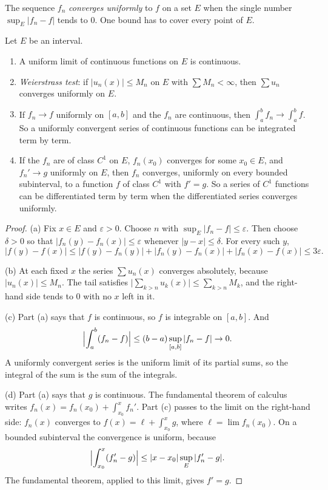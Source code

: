 The sequence $f_n$ \emph{converges uniformly} to $f$ on a set $E$ when the single number $\sup_E|f_n-f|$ tends to $0$. One bound has to cover every point of $E$.

\begin{lemma}\label{lem:uniform}
Let $E$ be an interval.
\begin{enumerate}[label=(\alph*)]
\item A uniform limit of continuous functions on $E$ is continuous.
\item \emph{Weierstrass test}: if $|u_n(x)|\le M_n$ on $E$ with $\sum M_n<\infty$, then $\sum u_n$ converges uniformly on $E$.
\item If $f_n\to f$ uniformly on $[a,b]$ and the $f_n$ are continuous, then $\int_a^bf_n\to\int_a^bf$. So a uniformly convergent
series of continuous functions can be integrated term by term.
\item If the $f_n$ are of class $C^1$ on $E$, $f_n(x_0)$ converges for some $x_0\in E$, and $f_n'\to g$ uniformly on $E$, then $f_n$
converges, uniformly on every bounded subinterval, to a function $f$ of class $C^1$ with $f'=g$. So a series of $C^1$ functions can
be differentiated term by term when the differentiated series converges uniformly.
\end{enumerate}
\end{lemma}
\begin{proof}
(a) Fix $x\in E$ and $\varepsilon>0$. Choose $n$ with $\sup_E|f_n-f|\le\varepsilon$. Then choose $\delta>0$ so that $|f_n(y)-f_n(x)|\le\varepsilon$ whenever $|y-x|\le\delta$. For every such $y$,
\[
|f(y)-f(x)|\le|f(y)-f_n(y)|+|f_n(y)-f_n(x)|+|f_n(x)-f(x)|\le3\varepsilon.
\]

(b) At each fixed $x$ the series $\sum u_n(x)$ converges absolutely, because $|u_n(x)|\le M_n$. The tail satisfies $\bigl|\sum_{k>n}u_k(x)\bigr|\le\sum_{k>n}M_k$, and the right-hand side tends to $0$ with no $x$ left in it.

(c) Part (a) says that $f$ is continuous, so $f$ is integrable on $[a,b]$. And
\[
\Bigl|\int_a^b(f_n-f)\Bigr|\le(b-a)\sup_{[a,b]}|f_n-f|\to0.
\]
A uniformly convergent series is the uniform limit of its partial sums, so the integral of the sum is the sum of the integrals.

(d) Part (a) says that $g$ is continuous. The fundamental theorem of calculus writes $f_n(x)=f_n(x_0)+\int_{x_0}^xf_n'$. Part (c) passes to the limit on the right-hand side: $f_n(x)$ converges to $f(x)=\ell+\int_{x_0}^xg$, where $\ell=\lim f_n(x_0)$. On a bounded subinterval the convergence is uniform, because
\[
\Bigl|\int_{x_0}^x(f_n'-g)\Bigr|\le|x-x_0|\sup_E|f_n'-g|.
\]
The fundamental theorem, applied to this limit, gives $f'=g$.
\end{proof}

